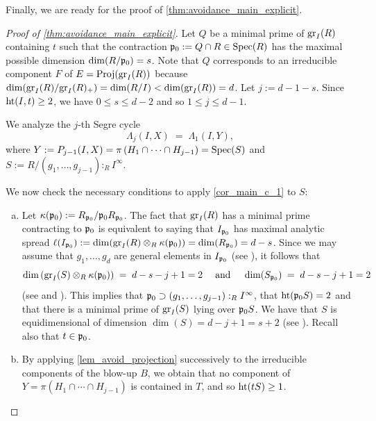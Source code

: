 \documentclass[a4paper, 11pt]{amsart}
\newcommand{\pp}{{\normalfont\mathfrak{p}}}
\newcommand{\HT}{\normalfont\text{ht}}
\newcommand{\gr}{{\normalfont\text{gr}}}
\newcommand{\Proj}{\normalfont\text{Proj}}
\newcommand{\Spec}{\normalfont\text{Spec}}
\theoremstyle{definition}
\begin{document}
	Finally, we are ready for the proof of \autoref{thm:avoidance_main_explicit}.
	
	\begin{proof}[Proof of \autoref{thm:avoidance_main_explicit}]
		Let $Q$ be a minimal prime of $\gr_I(R)$ containing $t$ such that the contraction $\pp_0 := Q \cap R \in \Spec(R)$ has the maximal  possible dimension $\dim(R/\pp_0) = s$.
		Note that $Q$ corresponds to an irreducible component $F$ of $E=\Proj(\gr_I(R))$ because $\dim(\gr_I(R)/\gr_I(R)_+) = \dim(R/I) < \dim(\gr_I(R)) = d$.
		Let $j := d-1-s$.
		Since $\HT(I, t) \ge 2$, we have $0 \le s \le d-2$ and so $1 \le j \le d-1$.
		
		We analyze the $j$-th Segre cycle
		$$
		\Lambda_j(I, X) \;=\; \Lambda_1\left(I, Y\right),
		$$
		where $Y := P_{j-1}(I, X) = \pi\left(H_1 \cap \cdots \cap H_{j-1}\right) = \Spec(S)$ and $S := R/(g_1,\ldots,g_{j-1}):_RI^\infty $.
		
		We now check the necessary conditions to apply \autoref{cor_main_c_1} to $S$:
		\begin{enumerate}[(a)]
			\item	Let $\kappa(\pp_0):=R_{\pp_0}/\pp_0R_{\pp_0}$.
			The fact that $\gr_I(R)$ has a minimal prime contracting to $\pp_0$ is equivalent to saying that $I_{\pp_0}$ has maximal analytic spread $\ell(I_{\pp_0}):=\dim(\gr_I(R) \otimes_R \kappa(\pp_0)) = \dim(R_{\pp_0})=d-s$. 
			Since we may assume that $g_1,\ldots,g_d$ are general elements in $I_{\pp_0}$ (see \cite[Lemma 2.6]{PTUV}), it follows that 
			$$
			\dim\left(\gr_I(S) \otimes_R \kappa(\pp_0)\right) \;=\; d-s-j+1=2 \quad \text{ and } \quad \dim(S_{\pp_0}) \;=\; d-s-j+1=2
			$$
			(see \cite[\S 8.5]{SwHu} and \cite[Remark 5.11]{CRPU}).
			This implies that $\pp_0 \supset (g_1,\ldots,g_{j-1}):_RI^\infty$, that $\HT(\pp_0 S)=2$ and that there is a minimal prime of $\gr_I(S)$ lying over $\pp_0S$.
			We have that $S$ is equidimensional of dimension $\dim(S) = d - j + 1 = s+2$ (see \cite[Remark 5.11]{CRPU}).
			Recall also that $t \in \pp_0$.
			
			\item By applying \autoref{lem_avoid_projection} successively to the irreducible components of the blow-up $B$, we obtain that no component of $Y = \pi(H_1 \cap \cdots \cap H_{j-1})$ is contained in $T$, and so $\HT(tS) \ge 1$.
			

\end{enumerate}
\end{proof}
\end{document}
